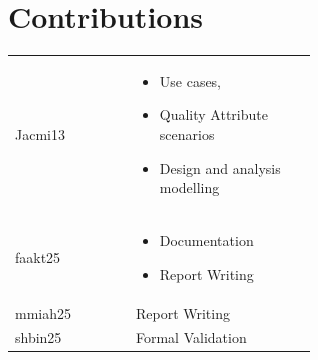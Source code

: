 \documentclass[conference]{IEEEtran}
\begin{document}
\newpage
\section*{Contributions}
\begin{tabular}{l|p{0.6\linewidth}}
Jacmi13 & \begin{itemize}
    \item Use cases,
    \item Quality Attribute scenarios
    \item Design and analysis modelling

\end{itemize}\\

faakt25 & \begin{itemize}
    \item Documentation
    \item Report Writing
\end{itemize}  \\
mmiah25 & Report Writing \\
shbin25 & Formal Validation\\

\end{tabular}
\end{document}
